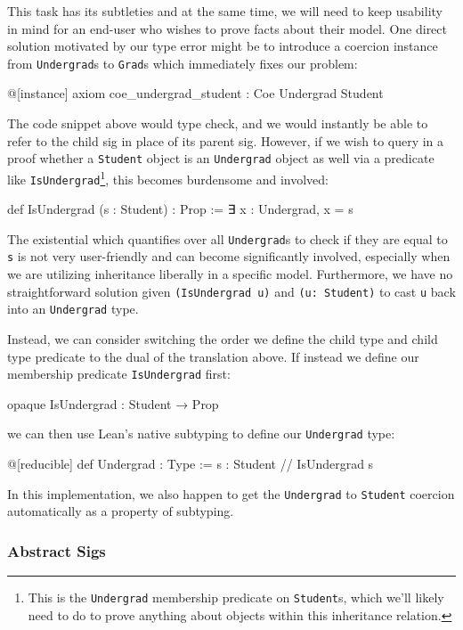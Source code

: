 This task has its subtleties and at the same time, we will need to keep usability in mind for an end-user who wishes to prove facts about their model. One direct solution motivated by our type error might be to introduce a coercion instance from \texttt{Undergrad}s to \texttt{Grad}s which immediately fixes our problem:
\begin{lean*}@[instance] axiom coe_undergrad_student : Coe Undergrad Student\end{lean*}
The code snippet above would type check, and we would instantly be able to refer to the child sig in place of its parent sig. However, if we wish to query in a proof whether a \texttt{Student} object is an \texttt{Undergrad} object as well via a predicate like \texttt{IsUndergrad}\footnote{This is the \texttt{Undergrad} membership predicate on \texttt{Student}s, which we'll likely need to do to prove anything about objects within this inheritance relation.}, this becomes burdensome and involved:
\begin{lean*}def IsUndergrad (s : Student) : Prop := ∃ x : Undergrad, x = s\end{lean*}
The existential which quantifies over all \texttt{Undergrad}s to check if they are equal to \texttt{s} is not very user-friendly and can become significantly involved, especially when we are utilizing inheritance liberally in a specific model. Furthermore, we have no straightforward solution given \texttt{(IsUndergrad u)} and \texttt{(u: Student)} to cast \texttt{u} back into an \texttt{Undergrad} type. 

Instead, we can consider switching the order we define the child type and child type predicate to the dual of the translation above. If instead we define our membership predicate \texttt{IsUndergrad} first:
\begin{lean*}opaque IsUndergrad : Student → Prop\end{lean*}
we can then use Lean's native subtyping to define our \texttt{Undergrad} type:
\begin{lean*}
@[reducible] def Undergrad : Type :=
  { s : Student // IsUndergrad s }
\end{lean*}
In this implementation, we also happen to get the \texttt{Undergrad} to \texttt{Student} coercion automatically as a property of subtyping.

\subsubsection{Abstract Sigs}

